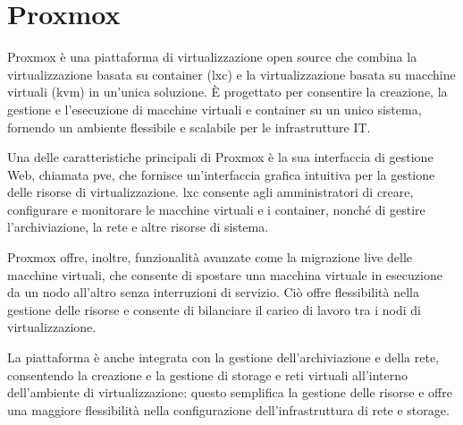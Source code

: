 \section{Proxmox}

Proxmox è una piattaforma di virtualizzazione open source che combina la virtualizzazione basata su container (\acrshort{lxc}) e la virtualizzazione basata su macchine virtuali (\acrfull{kvm}) in un'unica soluzione. È progettato per consentire la creazione, la gestione e l'esecuzione di macchine virtuali e container su un unico sistema, fornendo un ambiente flessibile e scalabile per le infrastrutture IT.

Una delle caratteristiche principali di Proxmox è la sua interfaccia di gestione Web, chiamata \acrfull{pve}, che fornisce un'interfaccia grafica intuitiva per la gestione delle risorse di virtualizzazione. \acrshort{lxc} consente agli amministratori di creare, configurare e monitorare le macchine virtuali e i container, nonché di gestire l'archiviazione, la rete e altre risorse di sistema.

Proxmox offre, inoltre, funzionalità avanzate come la migrazione live delle macchine virtuali, che consente di spostare una macchina virtuale in esecuzione da un nodo all'altro senza interruzioni di servizio. Ciò offre flessibilità nella gestione delle risorse e consente di bilanciare il carico di lavoro tra i nodi di virtualizzazione.

La piattaforma è anche integrata con la gestione dell'archiviazione e della rete, consentendo la creazione e la gestione di storage e reti virtuali all'interno dell'ambiente di virtualizzazione: questo semplifica la gestione delle risorse e offre una maggiore flessibilità nella configurazione dell'infrastruttura di rete e storage.

